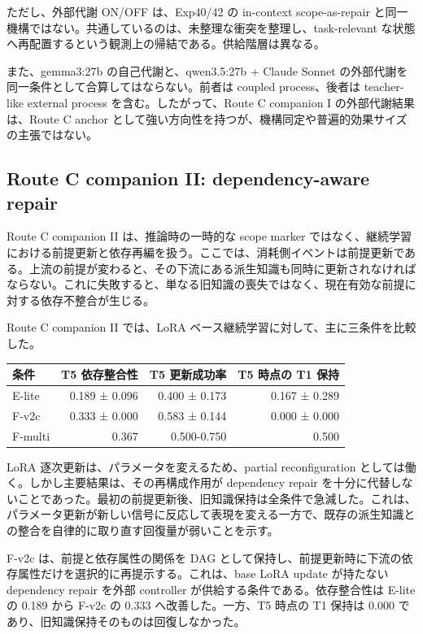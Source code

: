 \documentclass[12pt,a4paper]{article}
\begin{document}
ただし、外部代謝 ON/OFF は、Exp40/42 の in-context scope-as-repair と同一機構ではない。共通しているのは、未整理な衝突を整理し、task-relevant な状態へ再配置するという観測上の帰結である。供給階層は異なる。

また、gemma3:27b の自己代謝と、qwen3.5:27b + Claude Sonnet の外部代謝を同一条件として合算してはならない。前者は coupled process、後者は teacher-like external process を含む。したがって、Route C companion I の外部代謝結果は、Route C anchor として強い方向性を持つが、機構同定や普遍的効果サイズの主張ではない。

\subsection{Route C companion II: dependency-aware repair}\label{route-c-companion-ii-dependency-aware-repair}

Route C companion II は、推論時の一時的な scope marker ではなく、継続学習における前提更新と依存再編を扱う。ここでは、消耗側イベントは前提更新である。上流の前提が変わると、その下流にある派生知識も同時に更新されなければならない。これに失敗すると、単なる旧知識の喪失ではなく、現在有効な前提に対する依存不整合が生じる。

Route C companion II では、LoRA ベース継続学習に対して、主に三条件を比較した。

{\def\LTcaptype{table} %
\begin{longtable}[]{@{}lrrr@{}}
\toprule\noalign{}
条件 & T5 依存整合性 & T5 更新成功率 & T5 時点の T1 保持 \\
\midrule\noalign{}
\endhead
\bottomrule\noalign{}
\endlastfoot
E-lite & 0.189 ± 0.096 & 0.400 ± 0.173 & 0.167 ± 0.289 \\
F-v2c & 0.333 ± 0.000 & 0.583 ± 0.144 & 0.000 ± 0.000 \\
F-multi & 0.367 & 0.500-0.750 & 0.500 \\
\end{longtable}
}

LoRA 逐次更新は、パラメータを変えるため、partial reconfiguration としては働く。しかし主要結果は、その再構成作用が dependency repair を十分に代替しないことであった。最初の前提更新後、旧知識保持は全条件で急減した。これは、パラメータ更新が新しい信号に反応して表現を変える一方で、既存の派生知識との整合を自律的に取り直す回復量が弱いことを示す。

F-v2c は、前提と依存属性の関係を DAG として保持し、前提更新時に下流の依存属性だけを選択的に再提示する。これは、base LoRA update が持たない dependency repair を外部 controller が供給する条件である。依存整合性は E-lite の 0.189 から F-v2c の 0.333 へ改善した。一方、T5 時点の T1 保持は 0.000 であり、旧知識保持そのものは回復しなかった。
\end{document}
